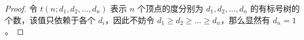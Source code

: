 \documentclass[cn,hazy,sakura,14pt,normal]{elegantnote}
\begin{document}
\begin{sloppypar}
\begin{proof}
    令 $t(n;d_1, d_2, \dots, d_n)$ 表示 $n$ 个顶点的度分别为 $d_1, d_2, \dots, d_n$ 的有标号树的个数，该值只依赖于各个 $d_i$，因此不妨令 $d_1 \geq d_2 \geq \dots \geq d_n$，那么显然有 $d_n = 1$。 
    
\end{proof}

\newpage

\nocite{*}
\printbibliography[heading=bibintoc, title=\ebibname]

\end{sloppypar}
\end{document}
